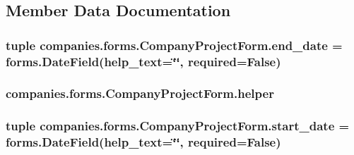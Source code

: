 \subsection{Member Data Documentation}
\hypertarget{classcompanies_1_1forms_1_1_company_project_form_a6e44065511febbb2281d28a7724e7612}{
\subsubsection[{end\-\_\-date}]{\setlength{\rightskip}{0pt plus 5cm}tuple companies.\-forms.\-Company\-Project\-Form.\-end\-\_\-date = forms.\-Date\-Field(help\-\_\-text=\char`\"{}\char`\"{}, required=False)\hspace{0.3cm}{\ttfamily [static]}}}\label{classcompanies_1_1forms_1_1_company_project_form_a6e44065511febbb2281d28a7724e7612}
\hypertarget{classcompanies_1_1forms_1_1_company_project_form_acf8255b4f24dbe2570906ee71797e3d4}{
\subsubsection[{helper}]{\setlength{\rightskip}{0pt plus 5cm}companies.\-forms.\-Company\-Project\-Form.\-helper}}\label{classcompanies_1_1forms_1_1_company_project_form_acf8255b4f24dbe2570906ee71797e3d4}
\hypertarget{classcompanies_1_1forms_1_1_company_project_form_a0e86ff1e038159e813385d1b091be9af}{
\subsubsection[{start\-\_\-date}]{\setlength{\rightskip}{0pt plus 5cm}tuple companies.\-forms.\-Company\-Project\-Form.\-start\-\_\-date = forms.\-Date\-Field(help\-\_\-text=\char`\"{}\char`\"{}, required=False)\hspace{0.3cm}{\ttfamily [static]}}}\label{classcompanies_1_1forms_1_1_company_project_form_a0e86ff1e038159e813385d1b091be9af}
